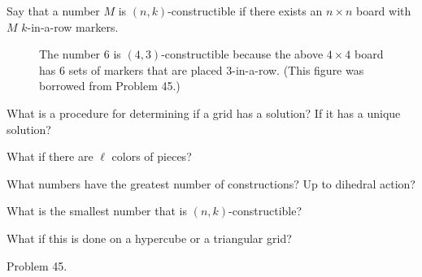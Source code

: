 \documentclass{article}
\begin{document}
Say that a number $M$ is $(n, k)$-constructible if there exists an $n\times n$
board with $M$ $k$-in-a-row markers.
\begin{figure}[!h]
  \centering
  \caption{
    The number $6$ is $(4, 3)$-constructible because the above $4 \times 4$
    board has $6$ sets of markers that are placed $3$-in-a-row.
    (This figure was borrowed from Problem 45.)
  }
\end{figure}
\begin{question}
  What is a procedure for determining if a grid has a solution? If it has a
  unique solution?
\end{question}
\begin{related}
  \item What if there are $\ell$ colors of pieces?
  \item What numbers have the greatest number of constructions? Up to dihedral
    action?
  \item What is the smallest number that is $(n, k)$-constructible?
  \item What if this is done on a hypercube or a triangular grid?
\end{related}
\begin{references}
  \item Problem 45.
\end{references}
\end{document}
